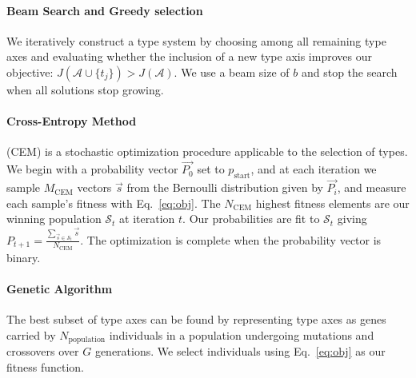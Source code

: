 \documentclass[letterpaper]{article}
\begin{document}
\paragraph{Beam Search and Greedy selection} We iteratively construct a type system by choosing among all remaining type axes and evaluating whether the inclusion of a new type axis improves our objective: $J(\mathcal{A} \cup \{t_j\}) > J(\mathcal{A})$. We use a beam size of $b$ and stop the search when all solutions stop growing.
\paragraph{Cross-Entropy Method} 
(CEM) \cite{rubinstein1999cross} is a stochastic optimization procedure applicable to the selection of types. We begin with a probability vector $\vec{P_0}$ set to $p_{\mathrm{start}}$, and at each iteration we sample $M_{\mathrm{CEM}}$ vectors $\vec{s}$ from the Bernoulli distribution given by $\vec{P_i}$, and measure each sample's fitness with Eq.~\ref{eq:obj}. The $N_{\mathrm{CEM}}$ highest fitness elements are our winning population $\mathcal{S}_t$ at iteration $t$. Our probabilities are fit to $\mathcal{S}_t$ giving $P_{t+1} = \frac{\sum_{\vec{s} \in \mathcal{S}_t}\vec{s}}{N_{\mathrm{CEM}}}$. The optimization is complete when the probability vector is binary.

\paragraph{Genetic Algorithm} The best subset of type axes can be found by representing type axes as genes carried by $N_{\mathrm{population}}$ individuals in a population undergoing mutations and crossovers \cite{harvey2009microbial} over $G$ generations. We select individuals using Eq.~\ref{eq:obj} as our fitness function.
\end{document}
